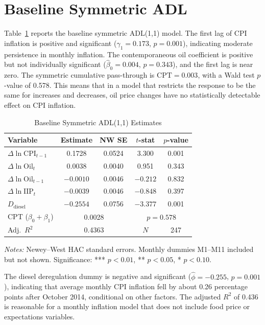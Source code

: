 \section{Baseline Symmetric ADL}

Table~\ref{tab:symmetric} reports the baseline symmetric ADL(1,1) model. The first lag of CPI inflation is positive and significant ($\hat{\gamma}_1 = 0.173$, $p = 0.001$), indicating moderate persistence in monthly inflation. The contemporaneous oil coefficient is positive but not individually significant ($\hat{\beta}_0 = 0.004$, $p = 0.343$), and the first lag is near zero. The symmetric cumulative pass-through is $\text{CPT} = 0.003$, with a Wald test $p$-value of 0.578. This means that in a model that restricts the response to be the same for increases and decreases, oil price changes have no statistically detectable effect on CPI inflation.

\begin{table}[H]
\centering
\caption{Baseline Symmetric ADL(1,1) Estimates}
\label{tab:symmetric}
\begin{tabular}{lcccc}
\toprule
\textbf{Variable} & \textbf{Estimate} & \textbf{NW SE} & \textbf{$t$-stat} & \textbf{$p$-value} \\
\midrule
$\Delta\ln\text{CPI}_{t-1}$ & 0.1728 & 0.0524 & 3.300 & 0.001 \\
$\Delta\ln\text{Oil}_{t}$ & 0.0038 & 0.0040 & 0.951 & 0.343 \\
$\Delta\ln\text{Oil}_{t-1}$ & $-0.0010$ & 0.0046 & $-0.212$ & 0.832 \\
$\Delta\ln\text{IIP}_{t}$ & $-0.0039$ & 0.0046 & $-0.848$ & 0.397 \\
$D_{\text{diesel}}$ & $-0.2554$ & 0.0756 & $-3.377$ & 0.001 \\
\midrule
CPT ($\beta_0 + \beta_1$) & \multicolumn{2}{c}{0.0028} & \multicolumn{2}{c}{$p = 0.578$} \\
Adj.\ $R^2$ & \multicolumn{2}{c}{0.4363} & $N$ & 247 \\
\bottomrule
\end{tabular}
\begin{flushleft}
\vspace{0.3em}
\small\textit{Notes:} Newey--West HAC standard errors. Monthly dummies M1--M11 included but not shown. Significance: *** $p < 0.01$, ** $p < 0.05$, * $p < 0.10$.
\end{flushleft}
\end{table}

The diesel deregulation dummy is negative and significant ($\hat{\phi} = -0.255$, $p = 0.001$), indicating that average monthly CPI inflation fell by about 0.26 percentage points after October 2014, conditional on other factors. The adjusted $R^2$ of 0.436 is reasonable for a monthly inflation model that does not include food price or expectations variables.

